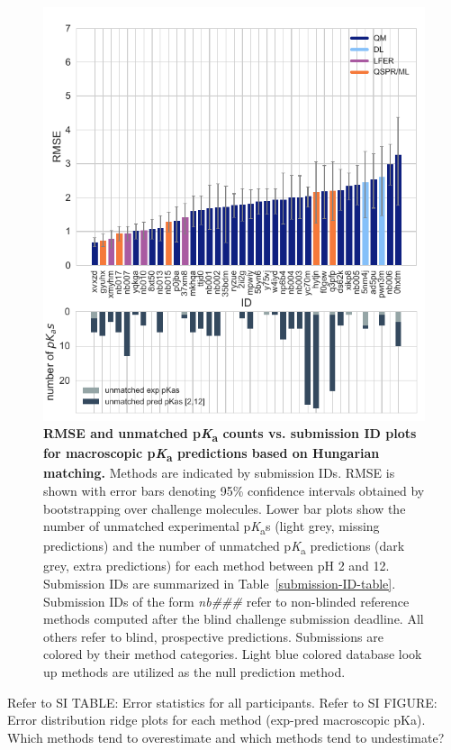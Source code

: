 \documentclass[9pt,lineno,final]{elife}
\newcommand{\pKa}{p\textit{K}\textsubscript{a}}
\begin{document}
\begin{figure}
\centering
\includegraphics[width=0.5\linewidth]{figures/typeIII-rmse-unmatched-pKa-fig.pdf}
\caption{{\bf RMSE and unmatched \pKa{} counts vs. submission ID plots for macroscopic \pKa{} predictions based on Hungarian matching.} 
Methods are indicated by submission IDs. 
RMSE is shown with error bars denoting 95\% confidence intervals obtained by bootstrapping over challenge molecules. Lower bar plots show the number of unmatched experimental \pKa{}s (light grey, missing predictions) and the number of unmatched \pKa{} predictions (dark grey, extra predictions) for each method between pH 2 and 12. Submission IDs are summarized in Table~\ref{submission-ID-table}. Submission IDs of the form \textit{nb\#\#\#} refer to non-blinded reference methods computed after the blind challenge submission deadline. All others refer to blind, prospective predictions. Submissions are colored by their method categories. Light blue colored database look up methods are utilized as the null prediction method.
}
\label{fig:typeIII-rmse-plot}
\end{figure}



Refer to SI TABLE: Error statistics for all participants.  
Refer to SI FIGURE: Error distribution ridge plots for each method  (exp-pred macroscopic pKa). Which methods tend to overestimate and which methods tend to undestimate?  
\end{document}
